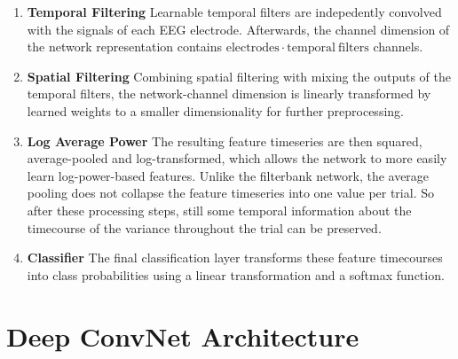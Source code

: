 \begin{enumerate}
\item
\textbf{Temporal Filtering} Learnable temporal filters are indepedently convolved with the signals
of each EEG electrode. Afterwards, the channel dimension of the network
representation contains
\(\mathrm{electrodes} \cdot \mathrm{temporal~ filters}\) channels. 

\item
\textbf{Spatial Filtering} Combining spatial filtering with mixing the
outputs of the temporal filters, the network-channel dimension is
linearly transformed by learned weights to a smaller dimensionality for
further preprocessing. 

\item
\textbf{Log Average Power} The resulting feature timeseries are then squared, average-pooled and log-transformed, which allows the network to more easily learn log-power-based features. Unlike the filterbank network, the average pooling does not collapse the feature timeseries into one value per trial. So after these processing steps, still some temporal information about the timecourse of the variance throughout the trial can be preserved. 

\item
\textbf{Classifier} The final classification layer transforms these feature timecourses into class probabilities using a linear transformation and a softmax function.
\end{enumerate}


\section{Deep ConvNet Architecture}\label{deep-convnet-architecture}

